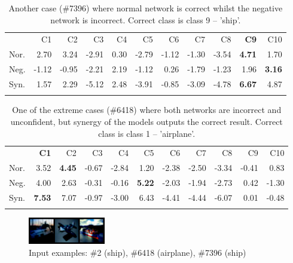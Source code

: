 \documentclass[b5paper]{book}
\begin{document}
\begin{table}
\centering
\caption{Another case (\#7396) where normal network is correct whilst the negative network is incorrect. Correct class is class 9 -- 'ship'.}
\label{tab:4}
\tabcolsep=0.06cm
\begin{tabular}{lrrrrrrrrrr}
\hline\noalign{\smallskip}
 & C1 & C2 & C3 & C4 & C5 & C6 & C7 & C8 & \textbf{C9} & C10 \\
\noalign{\smallskip}\hline\noalign{\smallskip}
Nor. & 2.70 & 3.24 & -2.91 & 0.30 & -2.79 & -1.12 & -1.30 & -3.54 & \textbf{4.71} & 1.70 \\
Neg. & -1.12 & -0.95 & -2.21 & 2.19 & -1.12 & 0.26 & -1.79 & -1.23 & 1.96 & \textbf{3.16} \\
Syn. & 1.57 & 2.29 & -5.12 & 2.48 & -3.91 & -0.85 & -3.09 & -4.78 & \textbf{6.67} & 4.87 \\
\noalign{\smallskip}\hline
\end{tabular}
\end{table}

\begin{table}
\centering
\caption{One of the extreme cases (\#6418) where both networks are incorrect and unconfident, but synergy of the models outputs the correct result. Correct class is class 1 -- 'airplane'.}
\label{tab:5}
\tabcolsep=0.06cm
\begin{tabular}{lrrrrrrrrrr}
\hline\noalign{\smallskip}
 & \textbf{C1} & C2 & C3 & C4 & C5 & C6 & C7 & C8 & C9 & C10 \\
\noalign{\smallskip}\hline\noalign{\smallskip}
Nor. & 3.52 & \textbf{4.45} & -0.67 & -2.84 & 1.20 & -2.38 & -2.50 & -3.34 & -0.41 & 0.83 \\
Neg. & 4.00 & 2.63 & -0.31 & -0.16 & \textbf{5.22} & -2.03 & -1.94 & -2.73 & 0.42 & -1.30 \\
Syn. & \textbf{7.53} & 7.07 & -0.97 & -3.00 & 6.43 & -4.41 & -4.44 & -6.07 & 0.01 & -0.48 \\
\noalign{\smallskip}\hline
\end{tabular}
\end{table}

\begin{figure}
    \centering
    \includegraphics[width=0.3\textwidth]{figures/fig2.png}
\caption{Input examples: \#2 (ship), \#6418 (airplane), \#7396 (ship)}
\label{fig:2} 
\end{figure}
\end{document}
